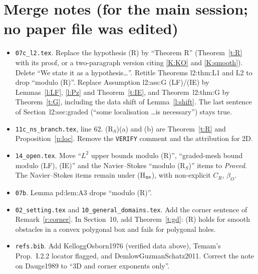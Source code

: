 \documentclass[11pt,reqno]{amsart}
\theoremstyle{plain}
\theoremstyle{definition}
\begin{document}
\section{Merge notes (for the main session; no paper file was edited)}
\begin{itemize}
\item \texttt{07c\_l2.tex}. Replace the hypothesis (R) by ``Theorem R'' (Theorem~\ref{t:R} with its proof, or a two-paragraph version citing \ref{K:KO} and \ref{K:smooth}). Delete ``We state it as a hypothesis\ldots''. Retitle Theorems l2:thm:L1 and L2 to drop ``modulo (R)''. Replace Assumption l2:ass:G (LF)/(IE) by Lemmas~\ref{l:LF}, \ref{l:Pz} and Theorem~\ref{t:IE}, and Theorem~l2:thm:G by Theorem~\ref{t:G}, including the data shift of Lemma~\ref{l:shift}. The last sentence of Section~l2:sec:graded (``some localisation \ldots is necessary'') stays true.
\item \texttt{11c\_ns\_branch.tex}, line 62. (R$_S$)(a) and (b) are Theorem~\ref{t:R} and Proposition~\ref{p:loc}. Remove the \texttt{VERIFY} comment and the \cite{Dauge1989} attribution for 2D.
\item \texttt{14\_open.tex}. Move ``$L^2$ upper bounds modulo (R)'', ``graded-mesh bound modulo (LF), (IE)'' and the Navier--Stokes ``modulo (R$_S$)'' items to \emph{Proved}. The Navier--Stokes items remain under (H$_{\rm ns}$), with non-explicit $C_R$, $\beta_O$.
\item \texttt{07b}. Lemma pd:lem:A3 drops ``modulo (R)''.
\item \texttt{02\_setting.tex} and \texttt{10\_general\_domains.tex}. Add the corner sentence of Remark~\ref{r:corner}. In Section~10, add Theorem~\ref{t:gd}: (R) holds for smooth obstacles in a convex polygonal box and fails for polygonal holes.
\item \texttt{refs.bib}. Add KelloggOsborn1976 (verified data above), Temam's Prop.~I.2.2 locator flagged, and DemlowGuzmanSchatz2011. Correct the note on Dauge1989 to ``3D and corner exponents only''.
\end{itemize}
\end{document}

